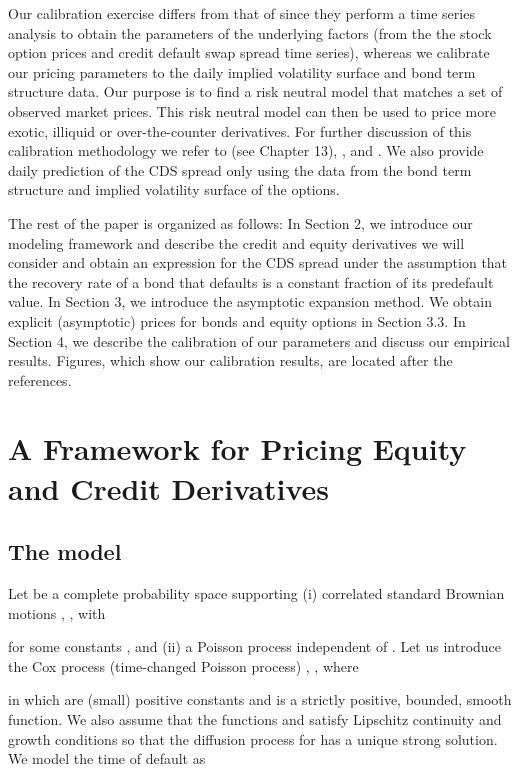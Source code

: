 \documentclass[11pt]{article}
\numberwithin{equation}{section}
\begin{document}
Our calibration exercise differs from that of \cite{carr-wu} since they perform a time series analysis to obtain the parameters of the underlying factors (from the the stock option prices and credit default swap spread time series), whereas we calibrate our pricing parameters to the daily implied volatility surface and bond term structure data.  Our purpose is to find a risk neutral model that matches a set of observed market prices. This risk neutral model can then be used to price more exotic, illiquid or over-the-counter derivatives. For further discussion of this calibration methodology we refer to \cite{cont} (see Chapter 13), \cite{sircar}, \cite{ronnie-timescale} and \cite{papa}.
We also provide daily prediction of the CDS spread only using the data from the bond term structure and implied volatility surface of the options. 

The rest of the paper is organized as follows: In Section 2, we introduce our modeling framework and describe the credit and equity derivatives we will consider and obtain an expression for the CDS spread under the assumption that the recovery rate of a bond that defaults is a constant fraction of its predefault value. In Section 3, we introduce the asymptotic expansion method. We obtain explicit (asymptotic) prices for bonds and equity options in Section  3.3. In Section 4, we describe the calibration of our parameters and discuss our empirical results. Figures, which show our calibration results, are located after the references.

\section{A Framework for Pricing Equity and Credit Derivatives}
\subsection{The model} 

Let  be a complete probability space supporting (i) correlated standard Brownian motions , , 
with

for some constants , 
and (ii) a Poisson process  independent of . 
Let us introduce the Cox process (time-changed Poisson process) , , where

in which  are (small) positive constants and  is a strictly positive, bounded, smooth function. We also assume that the functions  and  satisfy Lipschitz continuity and growth conditions so that the diffusion process for  has a unique strong solution.
We model the time of default as
\end{document}
